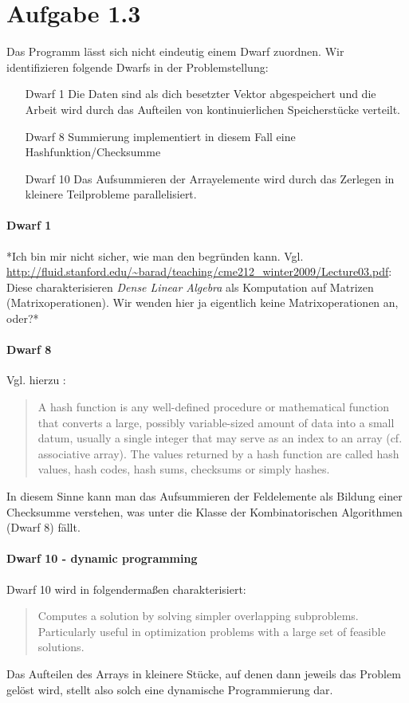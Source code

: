 \documentclass[a4paper,
               12pt,
               titlepage,
               BCOR12mm,
               ]{scrartcl}
\begin{document}
  
  \section*{Aufgabe 1.3}
		Das Programm lässt sich nicht eindeutig einem Dwarf zuordnen. Wir identifizieren folgende
		Dwarfs in der Problemstellung:
    \begin{itemize}
      \item [Dwarf 1] Die Daten sind als dich besetzter Vektor abgespeichert und die Arbeit wird durch das Aufteilen von kontinuierlichen Speicherstücke verteilt.
      \item [Dwarf 8] Summierung implementiert in diesem Fall eine Hashfunktion/Checksumme
      \item [Dwarf 10] Das Aufsummieren der Arrayelemente wird durch das Zerlegen in kleinere Teilprobleme parallelisiert.
    \end{itemize}
		\paragraph{Dwarf 1}
		*Ich bin mir nicht sicher, wie man den begründen kann. Vgl.
		\url{http://fluid.stanford.edu/~barad/teaching/cme212_winter2009/Lecture03.pdf}: Diese
		charakterisieren \emph{Dense Linear Algebra} als Komputation auf Matrizen
		(Matrixoperationen). Wir wenden hier ja eigentlich keine Matrixoperationen an, oder?*
		
		\paragraph{Dwarf 8}
		Vgl. hierzu \cite{wiki_hash}:
		\begin{quotation}
			A hash function is any well-defined procedure or mathematical function that converts
			a large, possibly variable-sized amount of data into a small datum, usually a single
			integer that may serve as an index to an array (cf. associative array). The values
			returned by a hash function are called hash values, hash codes, hash sums, checksums
			or simply hashes.
		\end{quotation}
		In diesem Sinne kann man das Aufsummieren der Feldelemente als Bildung einer
		Checksumme verstehen, was unter die Klasse der Kombinatorischen Algorithmen (Dwarf 8)
		fällt.

		\paragraph{Dwarf 10 - dynamic programming}
		Dwarf 10 wird in \cite[S. 16]{eecs} folgendermaßen charakterisiert:
		\begin{quotation}
			Computes a solution by solving simpler overlapping subproblems.
			Particularly useful in optimization problems with a large set of feasible
			solutions.
		\end{quotation}
		Das Aufteilen des Arrays in kleinere Stücke, auf denen dann jeweils das Problem gelöst
		wird, stellt also solch eine dynamische Programmierung dar.
\end{document}
